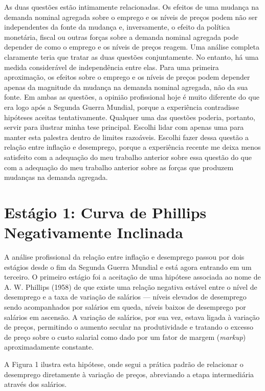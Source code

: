 \documentclass[12pt]{article}
\begin{document}
As duas questões estão intimamente relacionadas. Os efeitos de uma mudança na demanda nominal agregada sobre o emprego e os níveis de preços podem não ser independentes da fonte da mudança e, inversamente, o efeito da política monetária, fiscal ou outras forças sobre a demanda nominal agregada pode depender de como o emprego e os níveis de preços reagem. Uma análise completa claramente teria que tratar as duas questões conjuntamente. No entanto, há uma medida considerável de independência entre elas. Para uma primeira aproximação, os efeitos sobre o emprego e os níveis de preços podem depender apenas da magnitude da mudança na demanda nominal agregada, não da sua fonte. Em ambas as questões, a opinião profissional hoje é muito diferente do que era logo após a Segunda Guerra Mundial, porque a experiência contradisse hipóteses aceitas tentativamente. Qualquer uma das questões poderia, portanto, servir para ilustrar minha tese principal. Escolhi lidar com apenas uma para manter esta palestra dentro de limites razoáveis. Escolhi fazer dessa questão a relação entre inflação e desemprego, porque a experiência recente me deixa menos satisfeito com a adequação do meu trabalho anterior sobre essa questão do que com a adequação do meu trabalho anterior sobre as forças que produzem mudanças na demanda agregada.

\section{Estágio 1: Curva de Phillips Negativamente Inclinada}

A análise profissional da relação entre inflação e desemprego passou por dois estágios desde o fim da Segunda Guerra Mundial e está agora entrando em um terceiro. O primeiro estágio foi a aceitação de uma hipótese associada ao nome de A. W. Phillips (1958) de que existe uma relação negativa estável entre o nível de desemprego e a taxa de variação de salários — níveis elevados de desemprego sendo acompanhados por salários em queda, níveis baixos de desemprego por salários em ascensão. A variação de salários, por sua vez, estava ligada à variação de preços, permitindo o aumento secular na produtividade e tratando o excesso de preço sobre o custo salarial como dado por um fator de margem (\textit{markup}) aproximadamente constante.

A Figura 1 ilustra esta hipótese, onde segui a prática padrão de relacionar o desemprego diretamente à variação de preços, abreviando a etapa intermediária através dos salários.
\end{document}
